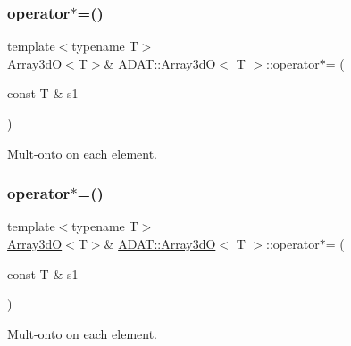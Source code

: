 \subsubsection{\texorpdfstring{operator$\ast$=()}{operator*=()}\hspace{0.1cm}{\footnotesize\ttfamily [4/6]}}
{\footnotesize\ttfamily template$<$typename T$>$ \\
\mbox{\hyperlink{classADAT_1_1Array3dO}{Array3dO}}$<$T$>$\& \mbox{\hyperlink{classADAT_1_1Array3dO}{A\+D\+A\+T\+::\+Array3dO}}$<$ T $>$\+::operator$\ast$= (\begin{DoxyParamCaption}\item[{const T \&}]{s1 }\end{DoxyParamCaption})\hspace{0.3cm}{\ttfamily [inline]}}



Mult-\/onto on each element. 

\mbox{\label{classADAT_1_1Array3dO_acec17a674874030d454e516aad24f8a8}} 
\subsubsection{\texorpdfstring{operator$\ast$=()}{operator*=()}\hspace{0.1cm}{\footnotesize\ttfamily [5/6]}}
{\footnotesize\ttfamily template$<$typename T$>$ \\
\mbox{\hyperlink{classADAT_1_1Array3dO}{Array3dO}}$<$T$>$\& \mbox{\hyperlink{classADAT_1_1Array3dO}{A\+D\+A\+T\+::\+Array3dO}}$<$ T $>$\+::operator$\ast$= (\begin{DoxyParamCaption}\item[{const T \&}]{s1 }\end{DoxyParamCaption})\hspace{0.3cm}{\ttfamily [inline]}}



Mult-\/onto on each element. 

\mbox{\label{classADAT_1_1Array3dO_acec17a674874030d454e516aad24f8a8}} 
